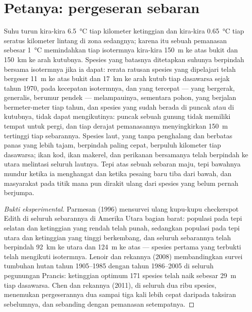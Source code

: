 \section{Petanya: pergeseran sebaran}

\begin{proposition}\label{prop:b2:global-change:range}
Suhu turun kira-kira \qty{6.5}{\celsius} tiap kilometer ketinggian dan
kira-kira \qty{0.65}{\celsius} tiap seratus kilometer lintang di zona
sedangnya; karena itu sebuah pemanasan sebesar \qty{1}{\celsius}
memindahkan tiap isotermnya kira-kira \qty{150}{m} ke atas bukit dan
\qty{150}{km} ke arah kutubnya. Spesies yang batasnya ditetapkan
suhunya berpindah bersama isotermnya jika ia dapat: rerata ratusan
spesies yang dipelajari telah bergeser \qty{11}{m} ke atas bukit dan
\qty{17}{km} ke arah kutub tiap dasawarsa sejak tahun 1970, pada
kecepatan isotermnya, dan yang tercepat --- yang bergerak, generalis,
berumur pendek --- melampauinya, sementara pohon, yang  berjalan
bermeter-meter tiap tahun, dan spesies yang sudah berada di puncak atau
di kutubnya, tidak dapat mengikutinya: puncak sebuah gunung tidak
memiliki tempat untuk pergi, dan tiap derajat pemanasannya
menyingkirkan \qty{150}{m} tertinggi tiap sebarannya. Spesies laut,
yang tanpa penghalang dan berbatas panas yang lebih tajam, berpindah
paling cepat, berpuluh kilometer tiap dasawarsa; ikan kod, ikan makerel,
dan perikanan bersamanya telah berpindah ke utara melintasi seluruh
lautnya. Tepi atas sebuah sebaran maju, tepi bawahnya mundur ketika ia
menghangat dan ketika pesaing baru tiba dari bawah, dan masyarakat pada
titik mana pun dirakit ulang dari spesies yang belum pernah berjumpa.
\end{proposition}
\begin{proof}[Bukti eksperimental]
Parmesan (1996) mensurvei ulang kupu-kupu checkerspot Edith di seluruh
sebarannya di Amerika Utara bagian barat: populasi pada tepi selatan
dan ketinggian yang rendah telah punah, sedangkan populasi pada tepi
utara dan ketinggian yang tinggi berkembang, dan seluruh sebarannya
telah berpindah \qty{92}{km} ke utara dan \qty{124}{m} ke atas ---
spesies pertama yang terbukti telah mengikuti isotermnya. Lenoir dan
rekannya (2008) membandingkan survei tumbuhan hutan tahun 1905--1985
dengan tahun 1986--2005 di seluruh pegunungan Prancis: ketinggian
optimum 171 spesies telah naik sebesar \qty{29}{m} tiap dasawarsa. Chen
dan rekannya (2011), di seluruh dua ribu spesies, menemukan
pergeserannya dua sampai tiga kali lebih cepat daripada taksiran
sebelumnya, dan sebanding dengan pemanasan setempatnya.
\end{proof}


